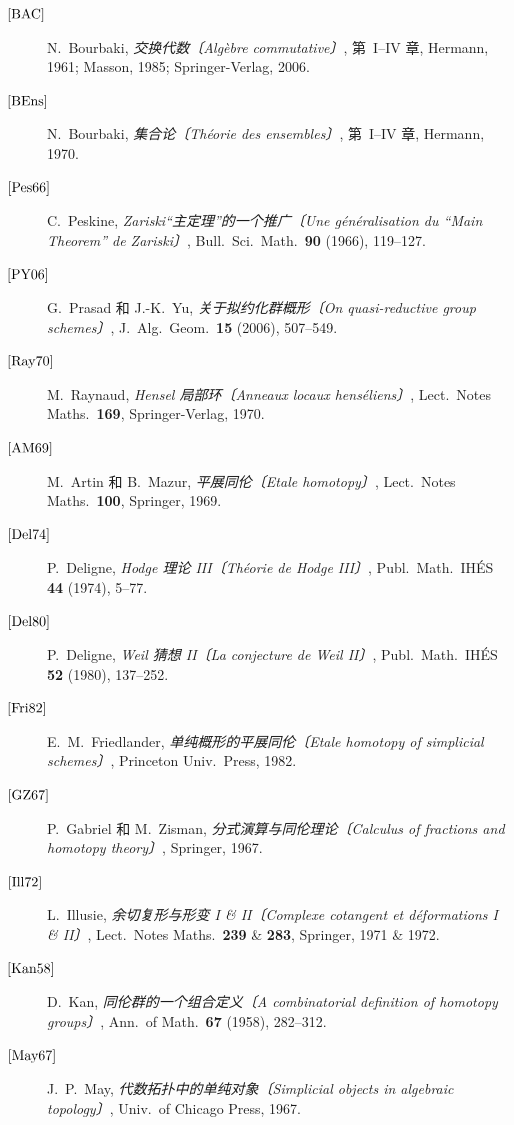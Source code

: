 \begin{description}
\item[\({[{\rm BAC}]}\)]
  N.~Bourbaki, \emph{交换代数〔Algèbre commutative〕}, 第~I--IV 章, Hermann, 1961;
  Masson, 1985; Springer-Verlag, 2006.
\item[\({[{\rm BEns}]}\)]
  N.~Bourbaki, \emph{集合论〔Théorie des ensembles〕}, 第~I--IV 章, Hermann, 1970.
\item[\({[{\rm Pes66}]}\)]
  C.~Peskine, \emph{Zariski“主定理”的一个推广〔Une généralisation du ``Main Theorem'' de Zariski〕},
  Bull.\ Sci.\ Math.\ \textbf{90} (1966), 119--127.
\item[\({[{\rm PY06}]}\)]
  G.~Prasad 和 J.-K.~Yu, \emph{关于拟约化群概形〔On quasi-reductive group schemes〕},
  J.\ Alg.\ Geom.\ \textbf{15} (2006), 507--549.
\item[\({[{\rm Ray70}]}\)]
  M.~Raynaud, \emph{Hensel 局部环〔Anneaux locaux henséliens〕}, Lect.\ Notes Maths.\
  \textbf{169}, Springer-Verlag, 1970.
\item[\({[{\rm AM69}]}\)]
  M.~Artin 和 B.~Mazur, \emph{平展同伦〔Etale homotopy〕}, Lect.\ Notes Maths.\
  \textbf{100}, Springer, 1969.
\item[\({[{\rm Del74}]}\)]
  P.~Deligne, \emph{Hodge 理论 III〔Théorie de Hodge III〕}, Publ.\ Math.\ IHÉS
  \textbf{44} (1974), 5--77.
\item[\({[{\rm Del80}]}\)]
  P.~Deligne, \emph{Weil 猜想 II〔La conjecture de Weil II〕}, Publ.\ Math.\ IHÉS
  \textbf{52} (1980), 137--252.
\item[\({[{\rm Fri82}]}\)]
  E.~M.~Friedlander, \emph{单纯概形的平展同伦〔Etale homotopy of simplicial schemes〕},
  Princeton Univ.\ Press, 1982.
\item[\({[{\rm GZ67}]}\)]
  P.~Gabriel 和 M.~Zisman, \emph{分式演算与同伦理论〔Calculus of fractions and homotopy theory〕}, Springer, 1967.
\item[\({[{\rm Ill72}]}\)]
  L.~Illusie, \emph{余切复形与形变 I \& II〔Complexe cotangent et déformations I \& II〕},
  Lect.\ Notes Maths.\ \textbf{239} \& \textbf{283}, Springer,
  1971 \& 1972.
\item[\({[{\rm Kan58}]}\)]
  D.~Kan, \emph{同伦群的一个组合定义〔A combinatorial definition of homotopy groups〕},
  Ann.\ of Math.\ \textbf{67} (1958), 282--312.
\item[\({[{\rm May67}]}\)]
  J.~P.~May, \emph{代数拓扑中的单纯对象〔Simplicial objects in algebraic topology〕},
  Univ.\ of Chicago Press, 1967.
\end{description}
